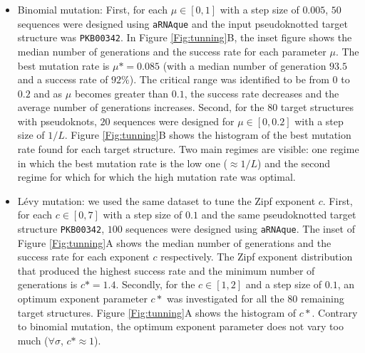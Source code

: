 \begin{itemize}
	\item Binomial mutation: First, for each $\mu \in [0,1]$ with a step size of $0.005$, $50$ sequences were designed using \texttt{aRNAque} and the input pseudoknotted target structure was \texttt{PKB00342}. In Figure \ref{Fig:tunning}B, the inset figure shows the median number of generations and the success rate for each parameter $\mu$. The best mutation rate is $\mu*=0.085$ (with a median number of generation $93.5$ and a success rate of $92\%$). The critical range was identified to be from $0$ to $0.2$ and as $\mu$ becomes greater than $0.1$, the success rate decreases and the average number of generations increases. Second, for the $80$ target structures with pseudoknots, $20$ sequences were designed for $\mu \in [0,0.2]$ with a step size of $1/L$. Figure \ref{Fig:tunning}B shows the histogram of the best mutation rate found for each target structure. Two main regimes are visible: one regime in which the best mutation rate is the low one ($\approx 1/L$) and the second regime for which for which the high mutation rate was optimal. 
	
	\item Lévy mutation: we used the same dataset to tune the Zipf exponent $c$. First, for each $c \in [0,7]$ with a step size of $0.1$ and the same pseudoknotted target structure \texttt{PKB00342}, $100$ sequences were designed using \texttt{aRNAque}. The inset of Figure \ref{Fig:tunning}A shows the median number of generations and the success rate for each exponent $c$ respectively. The Zipf exponent distribution that produced the highest success rate and the minimum number of generations is $c*=1.4$. Secondly, for the $c \in [1,2]$ and a step size of $0.1$, an optimum exponent parameter $c*$ was investigated for all the $80$ remaining target structures. Figure \ref{Fig:tunning}A shows the histogram of $c*$. Contrary to binomial mutation, the optimum exponent parameter does not vary too much ($\forall \sigma$, $c*\approx 1$).  
\end{itemize}

